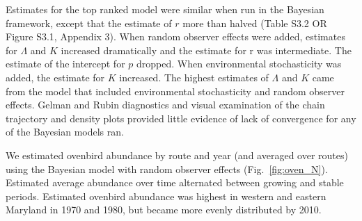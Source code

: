 \documentclass[12pt]{article}
\begin{document}
Estimates for the top ranked model %
were similar when
run in the Bayesian framework, except that the estimate of $r$
more than halved 
(Table S3.2 OR Figure S3.1, Appendix 3). %
When random observer effects
were added, estimates for $\Lambda$ and $K$ increased dramatically
and the estimate for r was intermediate. The %
estimate of the intercept for $p$ dropped. %
When environmental stochasticity was added, the estimate for $K$ increased. %
The highest estimates of $\Lambda$ and $K$ came 
from the model that included environmental stochasticity and random observer effects. %
Gelman and Rubin diagnostics and visual examination of the chain trajectory and density plots
provided little evidence of lack of convergence for any of the Bayesian models ran.  

We estimated ovenbird abundance by route and year (and averaged over routes) 
using the Bayesian model with random observer effects (Fig.~\ref{fig:oven_N}).  
Estimated average abundance over time alternated between growing and stable periods.  
Estimated ovenbird
abundance was highest in western and eastern Maryland in 1970 and 1980, but became
more evenly distributed by 2010.  
\end{document}
